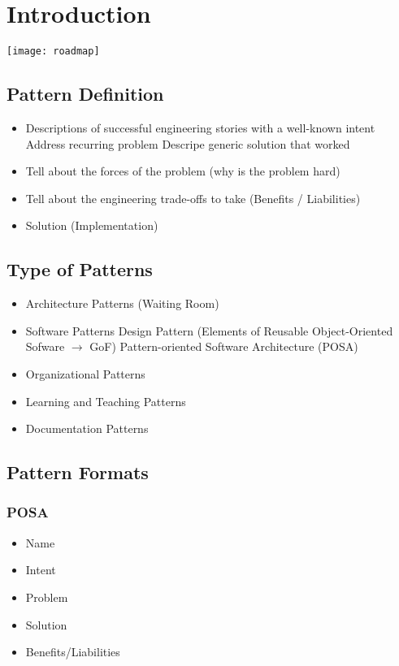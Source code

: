 
\section{Introduction}

\texttt{[image: roadmap]}

\subsection{Pattern Definition}
\begin{itemize}[topsep=0pt]
    \itemsep -0.4em
    \item Descriptions of successful engineering stories with a well-known intent
    \SubItem Address recurring problem
    \SubItem Descripe generic solution that worked
    \item Tell about the forces of the problem (why is the problem hard)
    \item Tell about the engineering trade-offs  to take (Benefits / Liabilities)
    \item Solution (Implementation)
\end{itemize}

\subsection{Type of Patterns}
\begin{itemize}[topsep=0pt]
    \itemsep -0.4em
    \item Architecture Patterns (Waiting Room)
    \item Software Patterns
    \SubItem Design Pattern (Elements of Reusable Object-Oriented Sofware $\rightarrow$ GoF)
    \SubItem Pattern-oriented Software Architecture (POSA)
    \item Organizational Patterns
    \item Learning and Teaching Patterns
    \item Documentation Patterns
\end{itemize}

\subsection{Pattern Formats}
\subsubsection{POSA}
\begin{itemize}[topsep=0pt]
    \itemsep -0.4em
    \item Name
    \item Intent
    \item Problem
    \item Solution
    \item Benefits/Liabilities
\end{itemize}

